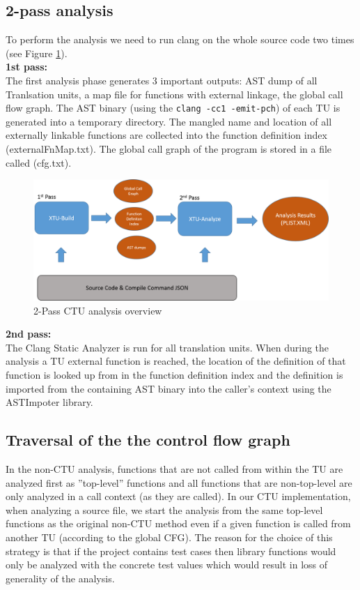 \documentclass{article}
\begin{document}
\subsection{ 2-pass analysis}
To perform the analysis we need to run clang on the whole source code two times 
(see Figure \ref{figctu}).\\
\textbf{1st pass:}\\
The first analysis phase generates 3 important outputs: AST dump of all
Tranlsation units, a map file for functions with external linkage, the global call flow graph.
The AST binary (using the {\tt clang -cc1 -emit-pch}) 
of each TU is generated into a temporary directory. 
The mangled name and location of all externally linkable functions 
are collected into the function definition index (externalFnMap.txt). 
The global call graph of the program is stored in a file called (cfg.txt).
\begin{figure}[h!]
\includegraphics[width=\textwidth]{images/ctu.png}
\caption{2-Pass CTU analysis overview}
\label{figctu}
\end{figure}

\textbf{2nd pass:}\\
The Clang Static Analyzer is run for all translation units. When during the
analysis a TU external function is reached, the location of the definition 
of that function is looked up from in the function definition index and the 
definition is imported from the containing AST binary into the caller's context
using the ASTImpoter library.

\subsection{Traversal of the the control flow graph}
In the non-CTU analysis, functions that are not called from within the TU are
analyzed first as ''top-level'' functions and all functions that are 
non-top-level are only analyzed in a call context (as they are called). 
In our CTU implementation, when analyzing a source file, we start the analysis
from the same top-level functions as the original non-CTU method even if a given
function is called from another TU (according to the global CFG). 
The reason for the choice of this strategy is that if the project 
contains test cases then library functions would only be analyzed with 
the concrete test values which would result in loss of generality of the analysis. 
\end{document}
